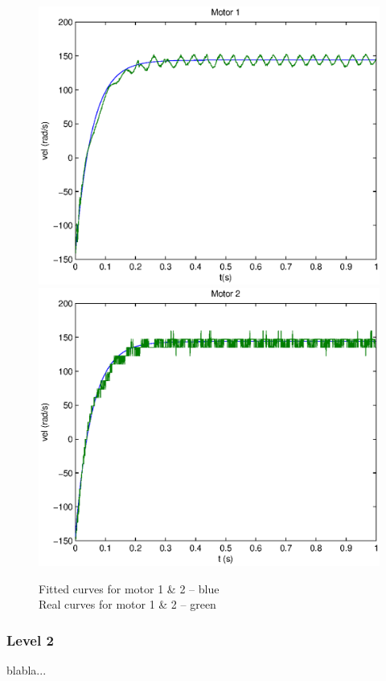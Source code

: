 \begin{center}
\begin{figure}[Ht]
 \includegraphics[width=\linewidth]{fig/motor1L1.eps}
 \includegraphics[width=\linewidth]{fig/motor2L1.eps}
 \caption{Fitted curves for motor 1 \& 2 -- blue\\ Real curves for motor 1 \& 2 -- green}
 \label{fittedCurves}
\end{figure}
\end{center}



\subsubsection*{Level 2}

blabla...